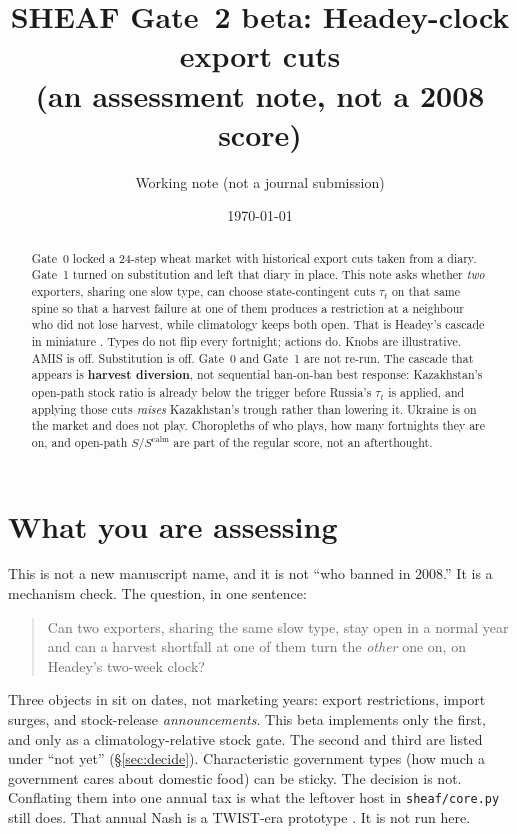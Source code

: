 \documentclass[11pt,a4paper]{article}
\title{SHEAF Gate~2 beta: Headey-clock export cuts\\
(an assessment note, not a 2008 score)}
\author{Working note (not a journal submission)}
\date{\today}
\begin{document}
\maketitle

\begin{abstract}
Gate~0 locked a 24-step wheat market with historical export cuts taken from a
diary. Gate~1 turned on substitution and left that diary in place. This note
asks whether \emph{two} exporters, sharing one slow type, can choose
state-contingent cuts \(\tau_t\) on that same spine so that a harvest failure
at one of them produces a restriction at a neighbour who did not lose harvest,
while climatology keeps both open. That is Headey's cascade in miniature
\citep{headey2011}. Types do not flip every fortnight; actions do. Knobs are
illustrative. AMIS is off. Substitution is off. Gate~0 and Gate~1 are not
re-run. The cascade that appears is \textbf{harvest diversion}, not
sequential ban-on-ban best response: Kazakhstan's open-path stock ratio is
already below the trigger before Russia's \(\tau_t\) is applied, and applying
those cuts \emph{raises} Kazakhstan's trough rather than lowering it. Ukraine
is on the market and does not play. Choropleths of who plays, how many
fortnights they are on, and open-path \(S/S^{\mathrm{calm}}\) are part of the
regular score, not an afterthought.
\end{abstract}

\tableofcontents
\vspace{1em}

\section{What you are assessing}
\label{sec:scope}

This is not a new manuscript name, and it is not ``who banned in 2008.''
It is a mechanism check. The question, in one sentence:

\begin{quote}
Can two exporters, sharing the same slow type, stay open in a normal year
and can a harvest shortfall at one of them turn the \emph{other} one on,
on Headey's two-week clock?
\end{quote}

Three objects in \citet{headey2011} sit on dates, not marketing years:
export restrictions, import surges, and stock-release \emph{announcements}.
This beta implements only the first, and only as a climatology-relative
stock gate. The second and third are listed under ``not yet''
(\S\ref{sec:decide}). Characteristic government types (how much a government
cares about domestic food) can be sticky. The decision is not. Conflating
them into one annual tax is what the leftover host in
\texttt{sheaf/core.py} still does. That annual Nash is a TWIST-era prototype
\citep{schewe2017,takayama1971,samuelson1952}. It is not run here.
\end{document}
